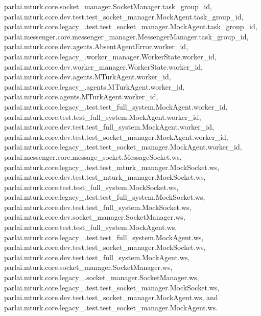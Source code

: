 parlai.\+mturk.\+core.\+socket\+\_\+manager.\+Socket\+Manager.\+task\+\_\+group\+\_\+id, parlai.\+mturk.\+core.\+dev.\+test.\+test\+\_\+socket\+\_\+manager.\+Mock\+Agent.\+task\+\_\+group\+\_\+id, parlai.\+mturk.\+core.\+legacy\+\_.\+test.\+test\+\_\+socket\+\_\+manager.\+Mock\+Agent.\+task\+\_\+group\+\_\+id, parlai.\+messenger.\+core.\+messenger\+\_\+manager.\+Messenger\+Manager.\+task\+\_\+group\+\_\+id, parlai.\+mturk.\+core.\+dev.\+agents.\+Absent\+Agent\+Error.\+worker\+\_\+id, parlai.\+mturk.\+core.\+legacy\+\_.\+worker\+\_\+manager.\+Worker\+State.\+worker\+\_\+id, parlai.\+mturk.\+core.\+dev.\+worker\+\_\+manager.\+Worker\+State.\+worker\+\_\+id, parlai.\+mturk.\+core.\+dev.\+agents.\+M\+Turk\+Agent.\+worker\+\_\+id, parlai.\+mturk.\+core.\+legacy\+\_.\+agents.\+M\+Turk\+Agent.\+worker\+\_\+id, parlai.\+mturk.\+core.\+agents.\+M\+Turk\+Agent.\+worker\+\_\+id, parlai.\+mturk.\+core.\+legacy\+\_.\+test.\+test\+\_\+full\+\_\+system.\+Mock\+Agent.\+worker\+\_\+id, parlai.\+mturk.\+core.\+test.\+test\+\_\+full\+\_\+system.\+Mock\+Agent.\+worker\+\_\+id, parlai.\+mturk.\+core.\+dev.\+test.\+test\+\_\+full\+\_\+system.\+Mock\+Agent.\+worker\+\_\+id, parlai.\+mturk.\+core.\+dev.\+test.\+test\+\_\+socket\+\_\+manager.\+Mock\+Agent.\+worker\+\_\+id, parlai.\+mturk.\+core.\+legacy\+\_.\+test.\+test\+\_\+socket\+\_\+manager.\+Mock\+Agent.\+worker\+\_\+id, parlai.\+messenger.\+core.\+message\+\_\+socket.\+Message\+Socket.\+ws, parlai.\+mturk.\+core.\+legacy\+\_.\+test.\+test\+\_\+mturk\+\_\+manager.\+Mock\+Socket.\+ws, parlai.\+mturk.\+core.\+dev.\+test.\+test\+\_\+mturk\+\_\+manager.\+Mock\+Socket.\+ws, parlai.\+mturk.\+core.\+test.\+test\+\_\+full\+\_\+system.\+Mock\+Socket.\+ws, parlai.\+mturk.\+core.\+legacy\+\_.\+test.\+test\+\_\+full\+\_\+system.\+Mock\+Socket.\+ws, parlai.\+mturk.\+core.\+dev.\+test.\+test\+\_\+full\+\_\+system.\+Mock\+Socket.\+ws, parlai.\+mturk.\+core.\+dev.\+socket\+\_\+manager.\+Socket\+Manager.\+ws, parlai.\+mturk.\+core.\+test.\+test\+\_\+full\+\_\+system.\+Mock\+Agent.\+ws, parlai.\+mturk.\+core.\+legacy\+\_.\+test.\+test\+\_\+full\+\_\+system.\+Mock\+Agent.\+ws, parlai.\+mturk.\+core.\+dev.\+test.\+test\+\_\+socket\+\_\+manager.\+Mock\+Socket.\+ws, parlai.\+mturk.\+core.\+dev.\+test.\+test\+\_\+full\+\_\+system.\+Mock\+Agent.\+ws, parlai.\+mturk.\+core.\+socket\+\_\+manager.\+Socket\+Manager.\+ws, parlai.\+mturk.\+core.\+legacy\+\_.\+socket\+\_\+manager.\+Socket\+Manager.\+ws, parlai.\+mturk.\+core.\+legacy\+\_.\+test.\+test\+\_\+socket\+\_\+manager.\+Mock\+Socket.\+ws, parlai.\+mturk.\+core.\+dev.\+test.\+test\+\_\+socket\+\_\+manager.\+Mock\+Agent.\+ws, and parlai.\+mturk.\+core.\+legacy\+\_.\+test.\+test\+\_\+socket\+\_\+manager.\+Mock\+Agent.\+ws.



